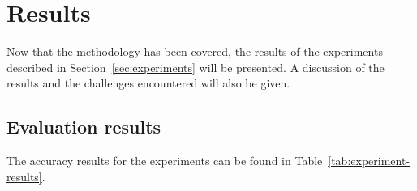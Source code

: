 \chapter{Results}
\label{chp:results}

Now that the methodology has been covered, the results of the experiments described in Section~\ref{sec:experiments} will be presented.
A discussion of the results and the challenges encountered will also be given.

\section{Evaluation results}
\label{sec:evaluation-results}

The accuracy results for the experiments can be found in Table~\ref{tab:experiment-results}.

